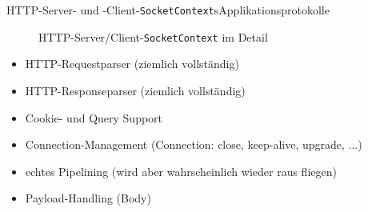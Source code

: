 \begin{frame}{HTTP-Server- und -Client-\texttt{SocketContext}s}{Applikationsprotokolle}
\begin{center}
\begin{figure}
    \caption{HTTP-Server/Client-\texttt{SocketContext} im Detail}
  \end{figure}
  \end{center}
  \begin{itemize}
    \item HTTP-\alert{Requestparser} (ziemlich vollständig)
    \item HTTP-\alert{Responseparser} (ziemlich vollständig)
    \item \alert{Cookie}- und \alert{Query} Support
    \item Connection-Management (Connection: close, keep-alive, upgrade, ...)
    \item echtes \alert{Pipelining} (wird aber wahrscheinlich wieder raus fliegen)
    \item \alert{Payload}-Handling (Body)
  \end{itemize}
\end{frame}
